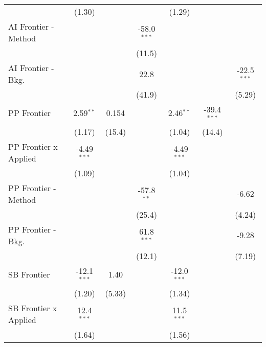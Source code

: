 \begin{tabular}{lcccccc}
                                & (1.30)        &        &               & (1.29)        &               &   \\   
   AI Frontier - Method         &               &        & -58.0$^{***}$ &               &               &   \\   
                                &               &        & (11.5)        &               &               &   \\   
   AI Frontier - Bkg.           &               &        & 22.8          &               &               & -22.5$^{***}$\\   
                                &               &        & (41.9)        &               &               & (5.29)\\   
   PP Frontier                  & 2.59$^{**}$   & 0.154  &               & 2.46$^{**}$   & -39.4$^{***}$ &   \\   
                                & (1.17)        & (15.4) &               & (1.04)        & (14.4)        &   \\   
   PP Frontier x Applied        & -4.49$^{***}$ &        &               & -4.49$^{***}$ &               &   \\   
                                & (1.09)        &        &               & (1.04)        &               &   \\   
   PP Frontier - Method         &               &        & -57.8$^{**}$  &               &               & -6.62\\   
                                &               &        & (25.4)        &               &               & (4.24)\\   
   PP Frontier - Bkg.           &               &        & 61.8$^{***}$  &               &               & -9.28\\   
                                &               &        & (12.1)        &               &               & (7.19)\\   
   SB Frontier                  & -12.1$^{***}$ & 1.40   &               & -12.0$^{***}$ &               &   \\   
                                & (1.20)        & (5.33) &               & (1.34)        &               &   \\   
   SB Frontier x Applied        & 12.4$^{***}$  &        &               & 11.5$^{***}$  &               &   \\   
                                & (1.64)        &        &               & (1.56)        &               &   \\   

\end{tabular}
